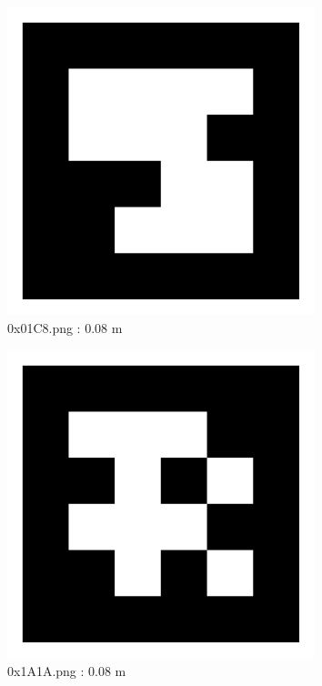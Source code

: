 \documentclass[11pt,a4,BCOR=0cm]{scrartcl}
\begin{document}
\begin{figure}
  \centering
    \includegraphics[width=8.955cm]{0x01C8.pdf}
    \caption{0x01C8.png : 0.08 m}
    \label{fig:0x01C8.pdf}
  
\end{figure} 

\begin{figure}
  \centering
    \includegraphics[width=8.955cm]{0x1A1A.pdf}
    \caption{0x1A1A.png : 0.08 m}
    \label{fig:0x1A1A.pdf}
  
\end{figure} 

\clearpage
\end{document}
